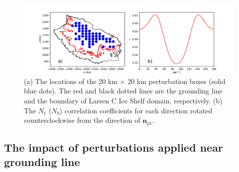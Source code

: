 \documentclass[tc, manuscript]{copernicus}
\begin{document}
\begin{figure}
	\centering
    \includegraphics[width=1\linewidth]{./figs/larsenc_r2_all_direction_more.pdf}
    \caption{(a) The locations of the 20 km $\times$ 20 km perturbation boxes (solid blue dots). The red and black dotted lines are the grounding line and the boundary of Larsen C Ice Shelf domain, respectively. (b)  The $N_r$ ($N_b$) correlation coefficients for each direction rotated counterclockwise from the direction of $\mathbf{n}_{p1}$.}
	\label{larsenc_r2_all_direction_more}
\end{figure}

\subsection{The impact of perturbations applied near grounding line}
\end{document}
